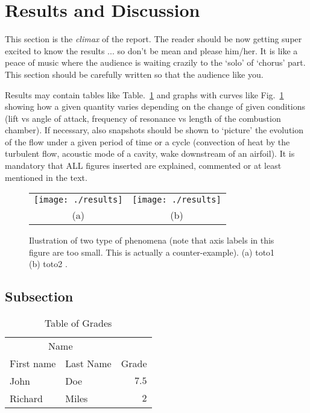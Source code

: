 \documentclass[fleqn,12pt]{NTFD} %
\begin{document}
\lipsum[9] %




\section{Results and Discussion}

This section is the {\it climax} of the report. The reader should be now getting super excited to know the results ... so don't be mean and please him/her. It is like a peace of music where the audience is waiting crazily to the `solo' of `chorus' part. This section should be carefully written so that the audience like you.

Results may contain tables like Table.~\ref{tab:label} and graphs with curves like Fig.~\ref{fig:results} showing how a given quantity varies depending on the change of given conditions (lift vs angle of attack, frequency of resonance vs length of the combustion chamber). If necessary, also snapshots should be shown to `picture' the evolution of the flow under a given period of time or a cycle (convection of heat by the turbulent flow, acoustic mode of a cavity, wake downstream of an airfoil). It is mandatory that ALL figures inserted are explained, commented or at least mentioned in the text.

\begin{figure}[tb]
\centering
\begin{tabular}{cc}
\texttt{[image: ./results]} & \texttt{[image: ./results]} \\
(a) & (b)
\end{tabular}
\caption{Ilustration of two type of  phenomena (note that axis labels in this figure are too small. This is actually a counter-example). (a) toto1 (b) toto2 .}
\label{fig:results}
\end{figure}


\lipsum[10] %

\subsection{Subsection}

\lipsum[11] %

\begin{table}[hbt]
\caption{Table of Grades}
\centering
\begin{tabular}{llr}
\toprule
\multicolumn{2}{c}{Name} \\
\cmidrule(r){1-2}
First name & Last Name & Grade \\
\midrule
John & Doe & $7.5$ \\
Richard & Miles & $2$ \\
\bottomrule
\end{tabular}
\label{tab:label}
\end{table}
\end{document}
